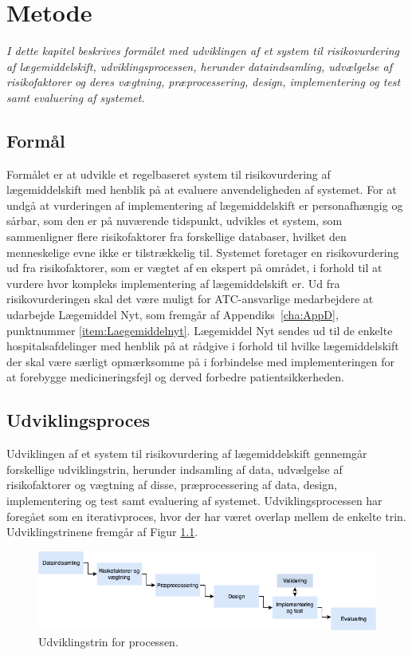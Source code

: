 \chapter{Metode}
\textit{I dette kapitel beskrives formålet med udviklingen af et system til risikovurdering af lægemiddelskift, udviklingsprocessen, herunder dataindsamling, udvælgelse af risikofaktorer og deres vægtning, præprocessering, design, implementering og test samt evaluering af systemet.}

\section{Formål}
Formålet er at udvikle et regelbaseret system til risikovurdering af lægemiddelskift med henblik på at evaluere anvendeligheden af systemet. For at undgå at vurderingen af implementering af lægemiddelskift er personafhængig og sårbar, som den er på nuværende tidspunkt, udvikles et system, som sammenligner flere risikofaktorer fra forskellige databaser, hvilket den menneskelige evne ikke er tilstrækkelig til. Systemet foretager en risikovurdering ud fra risikofaktorer, som er vægtet af en ekspert på området, i forhold til at vurdere hvor kompleks implementering af lægemiddelskift er. Ud fra risikovurderingen skal det være muligt for ATC-ansvarlige medarbejdere at udarbejde Lægemiddel Nyt, som fremgår af Appendiks~\ref{cha:AppD}, punktnummer \ref{item:Laegemiddelnyt}. Lægemiddel Nyt sendes ud til de enkelte hospitalsafdelinger med henblik på at rådgive i forhold til hvilke lægemiddelskift der skal være særligt opmærksomme på i forbindelse med implementeringen for at forebygge medicineringsfejl og derved forbedre patientsikkerheden. 

\section{Udviklingsproces}
Udviklingen af et system til risikovurdering af lægemiddelskift gennemgår forskellige udviklingstrin, herunder indsamling af data, udvælgelse af risikofaktorer og vægtning af disse, præprocessering af data, design, implementering og test samt evaluering af systemet. Udviklingsprocessen har foregået som en iterativproces, hvor der har været overlap mellem de enkelte trin. Udviklingstrinene fremgår af Figur \ref{fig:metode}. 

\begin{figure}[H]\centering	\includegraphics[width=1\textwidth]{billeder/udviklingstrin.png} 
	\caption{Udviklingstrin for processen.}
	\label{fig:metode}  
\end{figure}
\vspace{-0.5cm}

